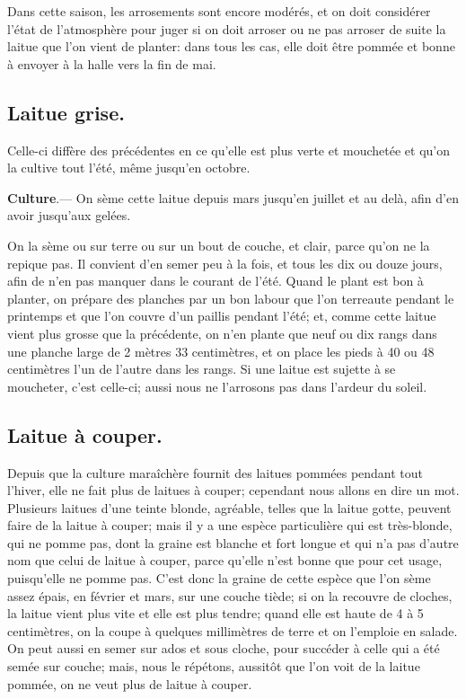 \documentclass[10pt,a4paper]{book}
\begin{document}
Dans cette saison, les arrosements sont encore modérés, et on doit considérer l'état de l'atmosphère pour juger si on doit arroser ou ne pas arroser de suite la laitue que l'on vient de planter: dans tous les cas, elle doit être pommée et bonne à envoyer à la halle vers la fin de mai.

\subsection{Laitue grise.}

Celle-ci diffère des précédentes en ce qu'elle est plus verte et mouchetée et qu'on la cultive tout l'été, même jusqu'en octobre.

\textbf{Culture}.--- On sème cette laitue depuis mars jusqu'en juillet et au delà, afin d'en avoir jusqu'aux gelées.

On la sème ou sur terre ou sur un bout de couche, et clair, parce qu'on ne la repique pas. Il convient d'en semer peu à la fois, et tous les dix ou douze jours, afin de n'en pas manquer dans le courant de l'été. Quand le plant est bon à planter, on prépare des planches par un bon labour que l'on terreaute pendant le printemps et que l'on couvre d'un paillis pendant l'été; et, comme cette laitue vient plus grosse que la précédente, on n'en plante que neuf ou dix rangs dans une planche large de 2 mètres 33 centimètres, et on place les pieds à 40 ou 48 centimètres l'un de l'autre dans les rangs. Si une laitue est sujette à se moucheter, c'est celle-ci; aussi nous ne l'arrosons pas dans l'ardeur du soleil.

\subsection{Laitue à couper.}

Depuis que la culture maraîchère fournit des laitues pommées pendant tout l'hiver, elle ne fait plus de laitues à couper; cependant nous allons en dire un mot. Plusieurs laitues d'une teinte blonde, agréable, telles que la laitue gotte, peuvent faire de la laitue à couper; mais il y a une espèce particulière qui est très-blonde, qui ne pomme pas, dont la graine est blanche et fort longue et qui n'a pas d'autre nom que celui de laitue à couper, parce qu'elle n'est bonne que pour cet usage, puisqu'elle ne pomme pas. C'est donc la graine de cette espèce que l'on sème assez épais, en février et mars, sur une couche tiède; si on la recouvre de cloches, la laitue vient plus vite et elle est plus tendre; quand elle est haute de 4 à 5 centimètres, on la coupe à quelques millimètres de terre et on l'emploie en salade. On peut aussi en semer sur ados et sous cloche, pour succéder à celle qui a été semée sur couche; mais, nous le répétons, aussitôt que l'on voit de la laitue pommée, on ne veut plus de laitue à couper.
\end{document}

